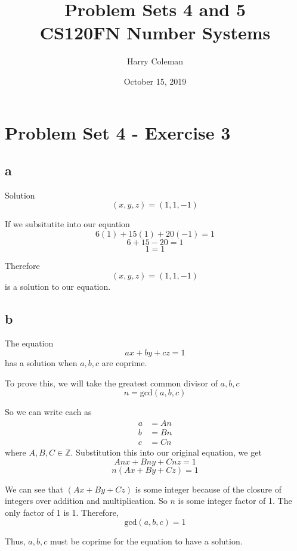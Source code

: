 \documentclass[12pt]{article}
\begin{document}
 
\title{Problem Sets 4 and 5\\
    \large CS120FN Number Systems}
\author{Harry Coleman}
\date{October 15, 2019}

\maketitle

\section*{Problem Set 4 - Exercise 3}

\subsection*{a}

Solution
\[(x, y, z) = (1, 1, -1)\]

If we subsitutite into our equation
\[6(1) + 15(1) + 20(-1) = 1\]
\[6 + 15 - 20 = 1\]
\[1 = 1\]

Therefore
\[(x, y, z) = (1, 1, -1)\]
is a solution to our equation.


\subsection*{b}

The equation
\[ax + by + cz = 1\]
has a solution when $a, b, c$ are coprime.

To prove this, we will take the greatest common divisor of $a, b, c$
\[n = \text{gcd}(a, b, c)\]

So we can write each as
\begin{align*}
    a &= An \\
    b &= Bn \\
    c &= Cn
\end{align*}
where $A, B, C \in \mathbb{Z}$. Substitution this into our original equation, we get
\[Anx + Bny + Cnz = 1\]
\[n(Ax + By + Cz) = 1\]

We can see that $(Ax + By + Cz)$ is some integer because of the closure of integers over addition and multiplication. So $n$ is some integer factor of 1. The only factor of 1 is 1. Therefore,
\[\text{gcd}(a, b, c) = 1\]

Thus, $a, b, c$ must be coprime for the equation to have a solution.
\end{document}

